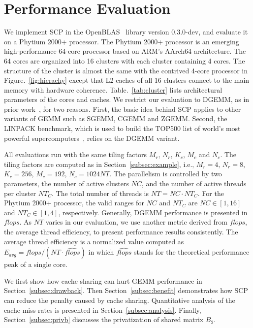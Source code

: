 \section{Performance Evaluation}\label{sec:evaluation}

We implement SCP in the OpenBLAS~\cite{openblas} library version 0.3.0-dev,
and evaluate it on a Phytium 2000+ processor.
The Phytium 2000+ processor is an emerging high-performance
64-core processor based on ARM's AArch64 architecture.
The 64 cores are organized into 16 clusters with each
cluster containing 4 cores.
The structure of the cluster is almost the same with
the contrived 4-core processor in Figure.~\ref{fig:hierachy}
except that L2 caches of all 16 clusters connect to the main memory
with hardware coherence.
Table.~\ref{tab:cluster} lists architectural parameters of the cores and caches.
We restrict our evaluation to DGEMM,
as in prior work~\cite{blispar,augem,poetmicro}, for two reasons.
First, the basic idea behind SCP applies to other
variants of GEMM such as SGEMM, CGEMM and ZGEMM.
Second, the LINPACK benchmark, which is used to build the
TOP500 list of world's most powerful supercomputers~\cite{top500},
relies on the DGEMM variant.

All evaluations run with the same tiling factors
$M_r$, $N_r$, $K_c$, $M_c$ and $N_c$.
The tiling factors are computed as in Section~\ref{subsec:example},
i.e., $M_r = 4$, $N_r = 8$, $K_c = 256$, $M_c = 192$, $N_c = 1024NT$.
The parallelism is controlled by two parameters,
the number of active clusters $NC$,
and the number of active threads per cluster $NT_C$.
The total number of threads is $NT = NC \cdot NT_C$.
For the Phytium 2000+ processor, the valid ranges for $NC$ and $NT_C$
are $NC \in [1, 16]$ and $NT_C \in [1, 4]$, respectively.
Generally, DGEMM performance is presented in $flops$.
As $NT$ varies in our evaluation,
we use another metric derived from $flops$,
the average thread efficiency,
to present performance results consistently.
The average thread efficiency is a normalized value computed as
$E_{avg} = flops / (NT \cdot \widehat{flops})$
in which $\widehat{flops}$ stands for the theoretical performance peak of a single core.

We first show how cache sharing can hurt GEMM performance
in Section~\ref{subsec:drawback}.
Then Section~\ref{subsec:benefit} demonstrates how SCP can reduce
the penalty caused by cache sharing.
Quantitative analysis of the cache miss rates
is presented in Section~\ref{subsec:analysis}.
Finally, Section~\ref{subsec:privb} discusses
the privatization of shared matrix $B_2$.

